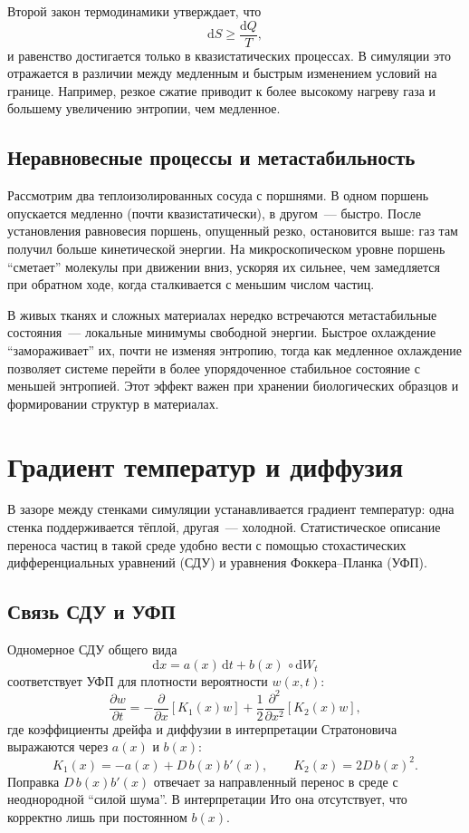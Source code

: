 \documentclass[12pt,a4paper]{article}
\begin{document}
Второй закон термодинамики утверждает, что
\begin{equation}
    \mathrm{d}S \ge \frac{\mathrm{d}Q}{T},
\end{equation}
и равенство достигается только в квазистатических процессах. В симуляции это отражается в различии между медленным и быстрым изменением условий на границе. Например, резкое сжатие приводит к более высокому нагреву газа и большему увеличению энтропии, чем медленное.

\subsection{Неравновесные процессы и метастабильность}
Рассмотрим два теплоизолированных сосуда с поршнями. В одном поршень опускается медленно (почти квазистатически), в другом~--- быстро. После установления равновесия поршень, опущенный резко, остановится выше: газ там получил больше кинетической энергии. На микроскопическом уровне поршень ``сметает'' молекулы при движении вниз, ускоряя их сильнее, чем замедляется при обратном ходе, когда сталкивается с меньшим числом частиц.

В живых тканях и сложных материалах нередко встречаются метастабильные состояния~--- локальные минимумы свободной энергии. Быстрое охлаждение ``замораживает'' их, почти не изменяя энтропию, тогда как медленное охлаждение позволяет системе перейти в более упорядоченное стабильное состояние с меньшей энтропией. Этот эффект важен при хранении биологических образцов и формировании структур в материалах.

\section{Градиент температур и диффузия}
В зазоре между стенками симуляции устанавливается градиент температур: одна стенка поддерживается тёплой, другая~--- холодной. Статистическое описание переноса частиц в такой среде удобно вести с помощью стохастических дифференциальных уравнений (СДУ) и уравнения Фоккера--Планка (УФП).

\subsection{Связь СДУ и УФП}
Одномерное СДУ общего вида
\begin{equation}
    \mathrm{d}x = a(x)\, \mathrm{d}t + b(x)\, \circ \mathrm{d}W_t
\end{equation}
соответствует УФП для плотности вероятности $w(x, t)$:
\begin{equation}
    \frac{\partial w}{\partial t} = -\frac{\partial}{\partial x} \left[ K_1(x) w \right] + \frac{1}{2} \frac{\partial^2}{\partial x^2} \left[ K_2(x) w \right],
\end{equation}
где коэффициенты дрейфа и диффузии в интерпретации Стратоновича выражаются через $a(x)$ и $b(x)$:
\begin{equation}
    K_1(x) = -a(x) + D\, b(x) b'(x), \qquad K_2(x) = 2 D\, b(x)^2.
\end{equation}
Поправка $D\, b(x) b'(x)$ отвечает за направленный перенос в среде с неоднородной ``силой шума''. В интерпретации Ито она отсутствует, что корректно лишь при постоянном $b(x)$.
\end{document}
